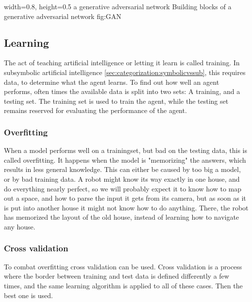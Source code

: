     {width=0.8\textwidth, height=0.5\textheight} %
    {a generative adversarial network}   %
    {Building blocks of a generative adversarial network}   %
    {fig:GAN}    %

\subsection{Learning} \cite[p. 693]{MA}
The act of teaching artificial intelligence or letting it learn is called training. In subsymbolic artificial intelligence \autoref{sec:categorization:symbolicvssub}, this requires data, to determine what the agent learns. To find out how well an agent performs, often times the available data is split into two sets: A training, and a testing set. The training set is used to train the agent, while the testing set remains reserved for evaluating the performance of the agent.

\subsubsection{Overfitting}
\label{sec:overfitting}
When a model performs well on a trainingset, but bad on the testing data, this is called overfitting. It happens when the model is "memorizing" the answers, which results in less general knowledge. This can either be caused by too big a model, or by bad training data\cite{overfit}. A robot might know its way exactly in one house, and do everything nearly perfect, so we will probably expect it to know how to map out a space, and how to parse the input it gets from its camera, but as soon as it is put into another house it might not know how to do anything. There, the robot has memorized the layout of the old house, instead of learning how to navigate any house.

\subsubsection{Cross validation}
\cite[p. 709]{MA}
To combat overfitting cross validation can be used. Cross validation is a process where the border between training and test data is defined differently a few times, and the same learning algorithm is applied to all of these cases. Then the best one is used.